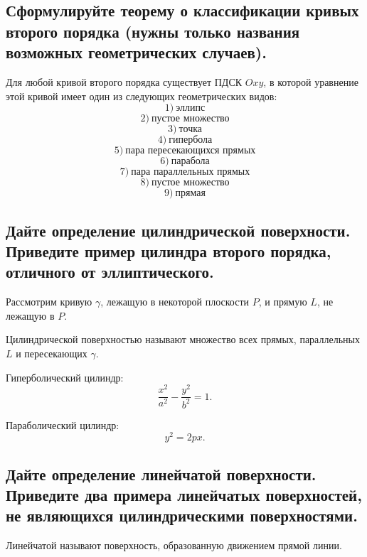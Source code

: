 \subsection{Сформулируйте теорему о классификации кривых второго порядка (нужны только названия возможных геометрических случаев).}

\begin{theorem}
    Для любой кривой второго порядка существует ПДСК $Oxy$, в которой уравнение этой кривой имеет один из следующих геометрических видов:
    \[
        1)\ \text{эллипс}
    \]
    \[
        2)\ \text{пустое множество}
    \]
    \[
        3)\ \text{точка}
    \]
    \[
        4)\ \text{гипербола}
    \]
    \[
        5)\ \text{пара пересекающихся прямых}
    \]
    \[
        6)\ \text{парабола}
    \]
    \[
        7)\ \text{пара параллельных прямых}
    \]
    \[
        8)\ \text{пустое множество}
    \]
    \[
        9)\ \text{прямая}
    \]
\end{theorem}

\subsection{Дайте определение цилиндрической поверхности. Приведите пример цилиндра второго порядка, отличного от эллиптического.}
Рассмотрим кривую $\gamma$, лежащую в некоторой плоскости $P$, и прямую $L$, не лежащую в $P$.

\begin{definition}
    Цилиндрической поверхностью называют множество всех прямых, параллельных $L$ и пересекающих $\gamma$.
\end{definition}

\begin{example}
    Гиперболический цилиндр:
    \[
        \frac{x^2}{a^2} - \frac{y^2}{b^2} = 1.
    \]
\end{example}

\begin{example}
    Параболический цилиндр:
    \[
        y^2 = 2px.
    \]
\end{example}

\subsection{Дайте определение линейчатой поверхности. Приведите два примера линейчатых поверхностей, не являющихся цилиндрическими поверхностями.}
\begin{definition}
    Линейчатой называют поверхность, образованную движением прямой линии.
\end{definition}

